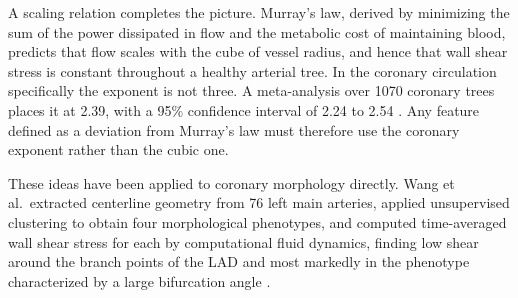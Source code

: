 A scaling relation completes the picture.
Murray's law, derived by minimizing the sum of the power dissipated in flow and the metabolic
cost of maintaining blood, predicts that flow scales with the cube of vessel radius, and
hence that wall shear stress is constant throughout a healthy arterial tree.
In the coronary circulation specifically the exponent is not three.
A meta-analysis over 1070 coronary trees places it at 2.39, with a 95\% confidence interval
of 2.24 to 2.54 \cite{taylor2024murray}.
Any feature defined as a deviation from Murray's law must therefore use the coronary
exponent rather than the cubic one.

These ideas have been applied to coronary morphology directly.
Wang et al.\ extracted centerline geometry from 76 left main arteries, applied unsupervised
clustering to obtain four morphological phenotypes, and computed time-averaged wall shear
stress for each by computational fluid dynamics, finding low shear around the branch points of
the LAD and most markedly in the phenotype characterized by a large bifurcation angle
\cite{wang2024lmphenotypes}.
